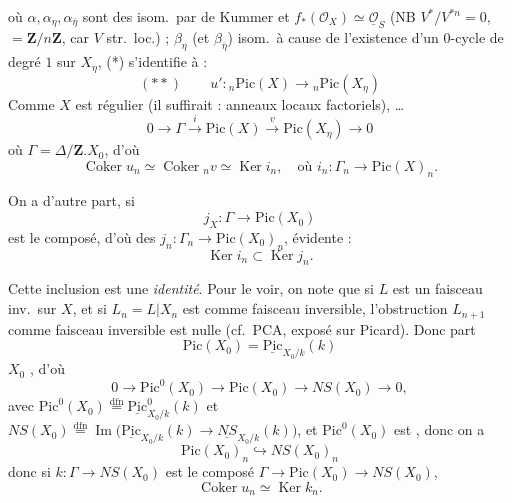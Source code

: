 \documentclass[11pt,a4paper]{article}
\begin{document}
où $\alpha, \alpha_\eta, \alpha_{\bar\eta}$ sont des isom.\ par  de Kummer et $f_*(\mathcal{O}_X) \simeq \underline{\mathcal{O}}_S$
(NB $V^*/V^{*n} = 0$,
 $= \mathbf{Z}/n\mathbf{Z}$, car $V$ str.\ loc.\@) ;
$\beta_\eta$ (et $\beta_{\bar\eta}$) \ill{} isom.\ à cause de l'existence d'un
$0$-cycle de degré $1$ sur $X_\eta$,  \ill{} \ill{} 
\ill{} (*) s'identifie à :
\[
(**) \qquad u' \colon {}_n\mathrm{Pic}(X) \to {}_n\mathrm{Pic}(X_\eta)
\]
Comme $X$ est régulier (il suffirait : anneaux locaux factoriels), \ldots
\[
0 \to \Gamma \xrightarrow{\ i\ } \mathrm{Pic}(X) \xrightarrow{\ v\ }
\mathrm{Pic}(X_\eta) \to 0
\]
où $\Gamma = \Delta/\mathbf{Z}.X_0$, d'où
\[
\operatorname{Coker} u_n \simeq \operatorname{Coker} {}_nv \simeq
\operatorname{Ker} i_n , \quad \text{où } i_n \colon \Gamma_n \to
\mathrm{Pic}(X)_n .
\]

  

On a d'autre part, si
\[
j_X \colon \Gamma \to \mathrm{Pic}(X_0)
\]
est le composé, d'où des $j_n \colon \Gamma_n \to \mathrm{Pic}(X_0)_n$,
\struck{\ill{}}  évidente :
\[
\operatorname{Ker} i_n \subset \operatorname{Ker} j_n .
\]

Cette inclusion est  une \emph{identité}. Pour le voir, on note
que si $L$ est un faisceau inv.\ sur $X$, et si $L_n = L|X_n$ est \ill{}
comme faisceau inversible,  l'obstruction \ill{} \ill{}
$L_{n+1}$ comme faisceau inversible est nulle (cf.\ PCA, exposé sur Picard).
Donc  part
\[
\mathrm{Pic}(X_0) = \underline{\mathrm{Pic}}_{X_0/k}(k)
\]
 \ill{} $X_0$ \ill{} , d'où
\[
0 \to \mathrm{Pic}^0(X_0) \to \mathrm{Pic}(X_0) \to NS(X_0) \to 0 ,
\]
avec $\mathrm{Pic}^0(X_0) \overset{\mathrm{dfn}}{=}
\underline{\mathrm{Pic}}^0_{X_0/k}(k)$ et $NS(X_0) \overset{\mathrm{dfn}}{=}
\operatorname{Im}\bigl(\underline{\mathrm{Pic}}_{X_0/k}(k) \to
\underline{NS}_{X_0/k}(k)\bigr)$, et $\mathrm{Pic}^0(X_0)$ est
, donc on a
\[
\mathrm{Pic}(X_0)_n \hookrightarrow NS(X_0)_n
\]
donc si $k \colon \Gamma \to NS(X_0)$ est le composé $\Gamma \to
\mathrm{Pic}(X_0) \to NS(X_0)$, \ill{}
\[
\operatorname{Coker} u_n \simeq \operatorname{Ker} k_n .
\]
\end{document}

